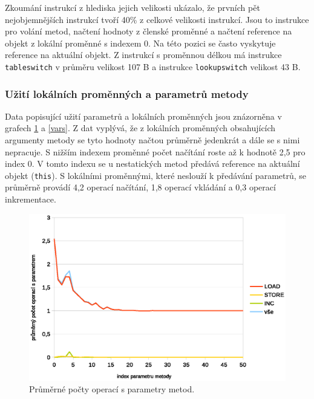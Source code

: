 Zkoumání instrukcí z hlediska jejich velikosti ukázalo, že prvních pět nejobjemnějších instrukcí tvoří 40\% z celkové velikosti instrukcí. Jsou to instrukce pro volání metod, načtení hodnoty z členské proměnné a načtení reference na objekt z lokální proměnné s indexem 0. Na této pozici se často vyskytuje reference na aktuální objekt. Z instrukcí s proměnnou délkou má instrukce \texttt{tableswitch} v průměru velikost 107 B a instrukce \texttt{lookupswitch} velikost 43 B.


\subsubsection{Užití lokálních proměnných a parametrů metody}

Data popisující užití parametrů a lokálních proměnných jsou znázorněna v grafech \ref{params} a \ref{vars}. Z dat vyplývá, že z lokálních proměnných obsahujících argumenty metody se tyto hodnoty načtou průměrně jedenkrát a dále se s nimi nepracuje. S nižším indexem proměnné počet načítání roste až k hodnotě 2,5 pro index 0. V tomto indexu se u nestatických metod předává reference na aktuální objekt (\texttt{this}). S lokálními proměnnými, které neslouží k předávání parametrů, se průměrně provádí 4,2 operací načítání, 1,8 operací vkládání a 0,3 operací inkrementace.

\begin{figure}[h!]
\centering
\includegraphics[scale=0.9]{fig/params}
\caption{Průměrné počty operací s parametry metod.}\label{params}
\end{figure}

